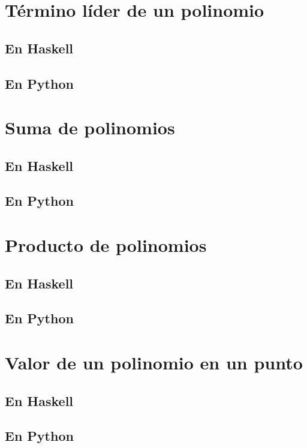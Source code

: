 \documentclass[a4paper,12pt,twoside]{book}
\begin{document}
\section{Término líder de un polinomio}
\subsection{En Haskell}
\subsection{En Python}

\section{Suma de polinomios}
\subsection{En Haskell}
\subsection{En Python}

\section{Producto de polinomios}
\subsection{En Haskell}
\subsection{En Python}

\section{Valor de un polinomio en un punto}
\subsection{En Haskell}
\subsection{En Python}
\end{document}
